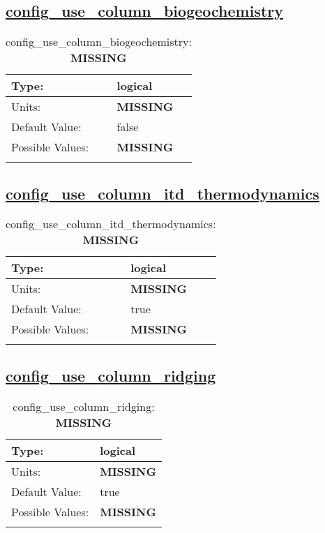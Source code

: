 \subsection[config\_use\_column\_biogeochemistry]{\hyperref[sec:nm_tab_column_package]{config\_use\_column\_biogeochemistry}}
\label{subsec:nm_sec_config_use_column_biogeochemistry}
\begin{center}
\begin{longtable}{| p{2.0in} || p{4.0in} |}
    \hline
    Type: & logical \\
    \hline
    Units: & {\bf \color{red} MISSING} \\
    \hline
    Default Value: & false \\
    \hline
    Possible Values: & {\bf \color{red} MISSING} \\
    \hline
    \caption{config\_use\_column\_biogeochemistry: {\bf \color{red} MISSING}}
\end{longtable}
\end{center}
\subsection[config\_use\_column\_itd\_thermodynamics]{\hyperref[sec:nm_tab_column_package]{config\_use\_column\_itd\_thermodynamics}}
\label{subsec:nm_sec_config_use_column_itd_thermodynamics}
\begin{center}
\begin{longtable}{| p{2.0in} || p{4.0in} |}
    \hline
    Type: & logical \\
    \hline
    Units: & {\bf \color{red} MISSING} \\
    \hline
    Default Value: & true \\
    \hline
    Possible Values: & {\bf \color{red} MISSING} \\
    \hline
    \caption{config\_use\_column\_itd\_thermodynamics: {\bf \color{red} MISSING}}
\end{longtable}
\end{center}
\subsection[config\_use\_column\_ridging]{\hyperref[sec:nm_tab_column_package]{config\_use\_column\_ridging}}
\label{subsec:nm_sec_config_use_column_ridging}
\begin{center}
\begin{longtable}{| p{2.0in} || p{4.0in} |}
    \hline
    Type: & logical \\
    \hline
    Units: & {\bf \color{red} MISSING} \\
    \hline
    Default Value: & true \\
    \hline
    Possible Values: & {\bf \color{red} MISSING} \\
    \hline
    \caption{config\_use\_column\_ridging: {\bf \color{red} MISSING}}
\end{longtable}
\end{center}
